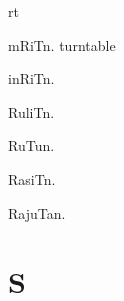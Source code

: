 \begin{multicols*}{2}
\begin{dictroot}{r}{t}
\begin{dictentry}{mRiT}{n.}
{            turntable
        }
    \end{dictentry}
    \begin{dictentry}{inRiT}{n.}
    \end{dictentry}
    \begin{dictentry}{RuliT}{n.}
    \end{dictentry}
    \begin{dictentry}{RuTu}{n.}
    \end{dictentry}
    \begin{dictentry}{RasiT}{n.}
    \end{dictentry}
    \begin{dictentry}{RajuTa}{n.}
    \end{dictentry}
\end{dictroot}

\section*{S}


\end{multicols*}

